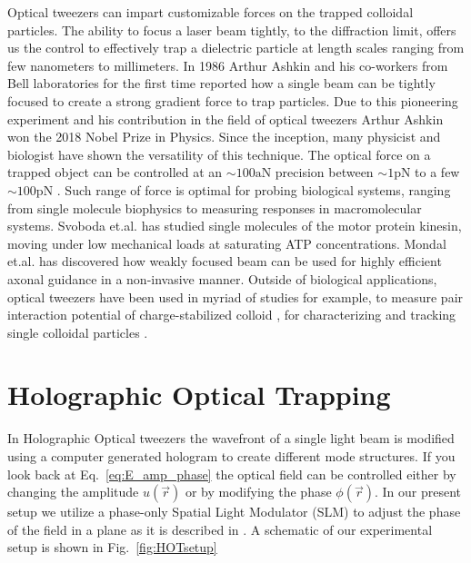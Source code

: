 Optical tweezers can impart customizable forces on the trapped colloidal particles. The ability to focus a laser beam tightly, to the diffraction limit, offers us the control to effectively trap a dielectric particle at length scales ranging from few nanometers to millimeters. In 1986 Arthur Ashkin and his co-workers \cite{Ashkin:86} from Bell laboratories for the first time reported how a single beam can be tightly focused to create a strong gradient force to trap particles. Due to this pioneering experiment and his contribution in the field of optical tweezers Arthur Ashkin won the 2018 Nobel Prize in Physics\cite{nobel_media_2019}. Since the inception, many physicist and biologist have shown the versatility of this technique\cite{grier2003nature}. The optical force on a trapped object can be controlled at an $\sim 100 \mathrm{aN}$ precision between $\sim 1 \mathrm{pN}$ to a few $\sim 100\mathrm{pN}$ \cite{Rohrbach:02}. Such range of force is optimal for probing biological systems, ranging from single molecule biophysics to measuring responses in macromolecular systems\cite{Svoboda1994,Litvinov7426,Brouhard2003}. Svoboda et.al. \cite{Svoboda11782} has studied single molecules of the motor protein kinesin, moving under low mechanical loads at saturating ATP concentrations. Mondal et.al. \cite{argha2014} has discovered how weakly focused beam can be used for highly efficient axonal guidance in a non-invasive manner. Outside of biological applications, optical tweezers have been used in myriad of studies for example, to measure pair interaction potential of charge-stabilized colloid \cite{crocker1994}, for characterizing and tracking single colloidal particles \cite{Lee07colloid, Cheong2009, xiao2010, chen2015, chen2016}.


\section{Holographic Optical Trapping}
\label{sec:HOT}
In Holographic Optical tweezers the wavefront of a single light beam is modified using a computer generated hologram to create different mode structures. If you look back at Eq.~\eqref{eq:E_amp_phase} the optical field can be controlled either by changing the amplitude $u(\vec{r})$ or by modifying the phase $\phi (\vec{r})$. In our present setup we utilize a phase-only Spatial Light Modulator (SLM) \cite{Igasaki1999} to adjust the phase of the field in a plane as it is described in \cite{he1995, dufrense2001hot, CURTIS2002169, Grier:06, Polin:05}. A schematic of our experimental setup is shown in Fig.~\ref{fig:HOTsetup}

